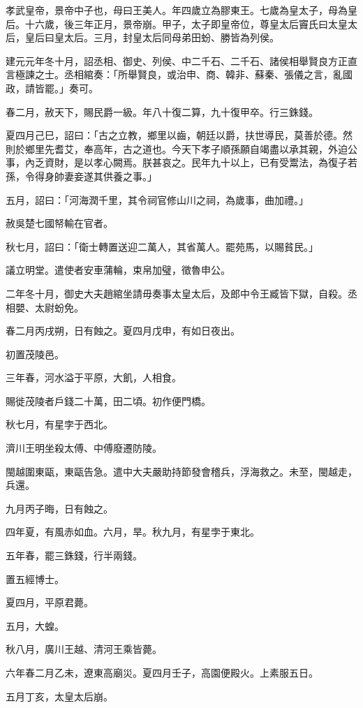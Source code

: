 
\begin{pinyinscope}
孝武皇帝，景帝中子也，母曰王美人。年四歲立為膠東王。七歲為皇太子，母為皇后。十六歲，後三年正月，景帝崩。甲子，太子即皇帝位，尊皇太后竇氏曰太皇太后，皇后曰皇太后。三月，封皇太后同母弟田蚡、勝皆為列侯。

建元元年冬十月，詔丞相、御史、列侯、中二千石、二千石、諸侯相舉賢良方正直言極諫之士。丞相綰奏：「所舉賢良，或治申、商、韓非、蘇秦、張儀之言，亂國政，請皆罷。」奏可。

春二月，赦天下，賜民爵一級。年八十復二算，九十復甲卒。行三銖錢。

夏四月己巳，詔曰：「古之立教，鄉里以齒，朝廷以爵，扶世導民，莫善於德。然則於鄉里先耆艾，奉高年，古之道也。今天下孝子順孫願自竭盡以承其親，外迫公事，內乏資財，是以孝心闕焉。朕甚哀之。民年九十以上，已有受鬻法，為復子若孫，令得身帥妻妾遂其供養之事。」

五月，詔曰：「河海潤千里，其令祠官修山川之祠，為歲事，曲加禮。」

赦吳楚七國帑輸在官者。

秋七月，詔曰：「衛士轉置送迎二萬人，其省萬人。罷苑馬，以賜貧民。」

議立明堂。遣使者安車蒲輪，束帛加璧，徵魯申公。

二年冬十月，御史大夫趙綰坐請毋奏事太皇太后，及郎中令王臧皆下獄，自殺。丞相嬰、太尉蚡免。

春二月丙戌朔，日有蝕之。夏四月戊申，有如日夜出。

初置茂陵邑。

三年春，河水溢于平原，大飢，人相食。

賜徙茂陵者戶錢二十萬，田二頃。初作便門橋。

秋七月，有星孛于西北。

濟川王明坐殺太傅、中傅廢遷防陵。

閩越圍東甌，東甌告急。遣中大夫嚴助持節發會稽兵，浮海救之。未至，閩越走，兵還。

九月丙子晦，日有蝕之。

四年夏，有風赤如血。六月，旱。秋九月，有星孛于東北。

五年春，罷三銖錢，行半兩錢。

置五經博士。

夏四月，平原君薨。

五月，大蝗。

秋八月，廣川王越、清河王乘皆薨。

六年春二月乙未，遼東高廟災。夏四月壬子，高園便殿火。上素服五日。

五月丁亥，太皇太后崩。


\end{pinyinscope}
